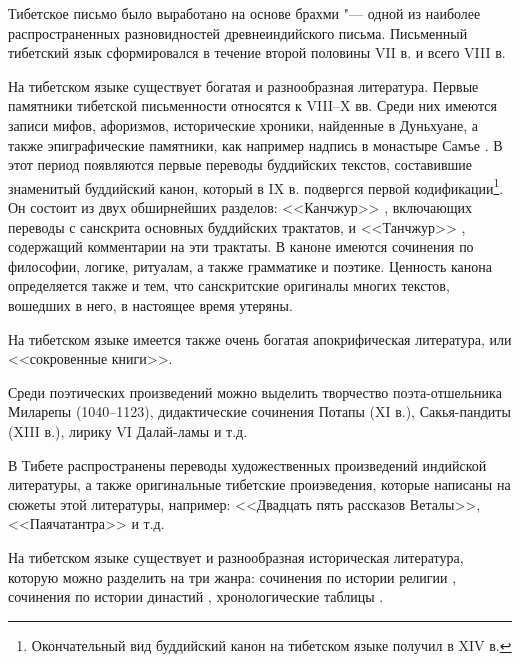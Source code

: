 Тибетское письмо было выработано на основе брахми "--- одной из наиболее распространенных разновидностей древнеиндийского письма. Письменный тибетский язык сформировался в течение второй половины VII в. и всего VIII в.

На тибетском языке существует богатая и разнообразная литература. Первые памятники тибетской письменности относятся к VIII--X вв. Среди них имеются записи мифов, афоризмов, исторические хроники, найденные в Дуньхуане, а также эпиграфические памятники, как например надпись в монастыре Самъе . В этот период появляются первые переводы буддийских текстов, составившие знаменитый буддийский канон, который в IX в. подвергся первой кодификации\footnote[2]{Окончательный вид буддийский канон на тибетском языке получил в XIV в.}. Он состоит из двух обширнейших разделов: <<Канчжур>> , включающих переводы с санскрита основных буддийских трактатов, и <<Танчжур>> , содержащий комментарии на эти трактаты. В каноне имеются сочинения по философии, логике, ритуалам, а также грамматике и поэтике. Ценность канона определяется также и тем, что санскритские оригиналы многих текстов, вошедших в него, в настоящее время утеряны.

На тибетском языке имеется также очень богатая апокрифическая литература, или <<сокровенные книги>>.

Среди поэтических произведений можно выделить творчество поэта-отшельника Миларепы (1040--1123), дидактические сочинения Потапы (XI в.), Сакья-пандиты (XIII в.), лирику VI Далай-ламы и т.д.

В Тибете распространены переводы художественных произведений индийской литературы, а также оригинальные тибетские проиэведения, которые написаны на сюжеты этой литературы, например: <<Двадцать пять рассказов Веталы>>, <<Паячатантра>> и т.д.

На тибетском языке существует и разнообразная историческая литература, которую можно разделить на три жанра: сочинения по истории религии , сочинения по истории династий , хронологические таблицы .

